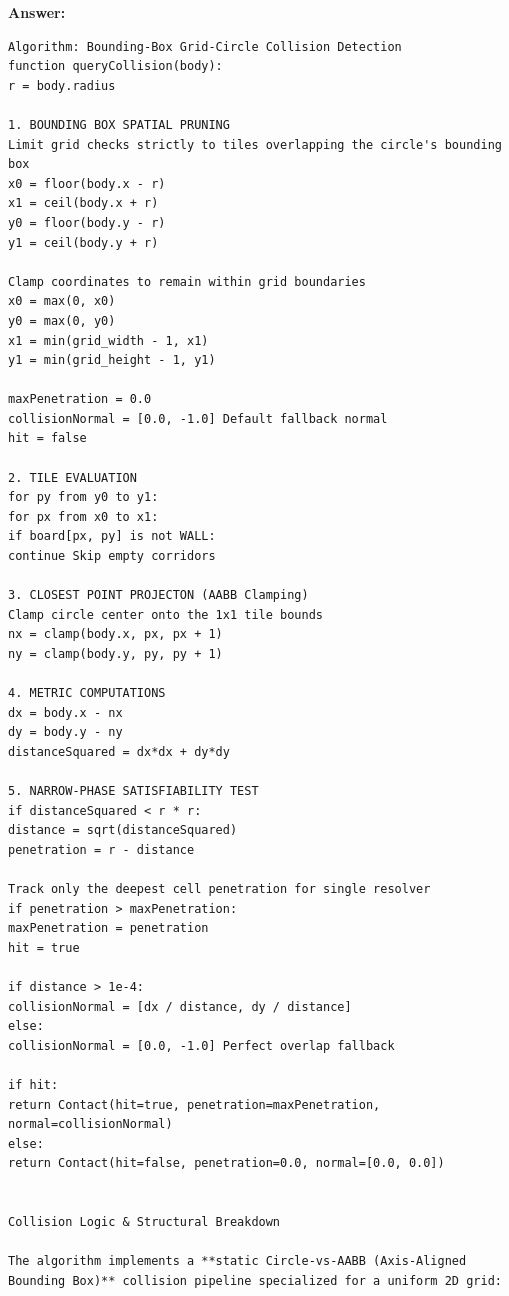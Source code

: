 \textbf{Answer:}
\begin{lstlisting}[language={}, breaklines=true]
Algorithm: Bounding-Box Grid-Circle Collision Detection
function queryCollision(body):
r = body.radius

1. BOUNDING BOX SPATIAL PRUNING
Limit grid checks strictly to tiles overlapping the circle's bounding box
x0 = floor(body.x - r)
x1 = ceil(body.x + r)
y0 = floor(body.y - r)
y1 = ceil(body.y + r)

Clamp coordinates to remain within grid boundaries
x0 = max(0, x0)
y0 = max(0, y0)
x1 = min(grid_width - 1, x1)
y1 = min(grid_height - 1, y1)

maxPenetration = 0.0
collisionNormal = [0.0, -1.0] Default fallback normal
hit = false

2. TILE EVALUATION
for py from y0 to y1:
for px from x0 to x1:
if board[px, py] is not WALL:
continue Skip empty corridors

3. CLOSEST POINT PROJECTON (AABB Clamping)
Clamp circle center onto the 1x1 tile bounds
nx = clamp(body.x, px, px + 1)
ny = clamp(body.y, py, py + 1)

4. METRIC COMPUTATIONS
dx = body.x - nx
dy = body.y - ny
distanceSquared = dx*dx + dy*dy

5. NARROW-PHASE SATISFIABILITY TEST
if distanceSquared < r * r:
distance = sqrt(distanceSquared)
penetration = r - distance

Track only the deepest cell penetration for single resolver
if penetration > maxPenetration:
maxPenetration = penetration
hit = true

if distance > 1e-4:
collisionNormal = [dx / distance, dy / distance]
else:
collisionNormal = [0.0, -1.0] Perfect overlap fallback

if hit:
return Contact(hit=true, penetration=maxPenetration, normal=collisionNormal)
else:
return Contact(hit=false, penetration=0.0, normal=[0.0, 0.0])


Collision Logic & Structural Breakdown

The algorithm implements a **static Circle-vs-AABB (Axis-Aligned Bounding Box)** collision pipeline specialized for a uniform 2D grid:


\end{lstlisting}
